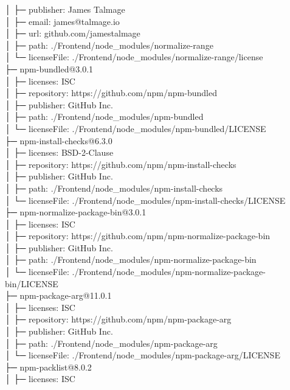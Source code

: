 │  ├─ publisher: James Talmage\\
│  ├─ email: james@talmage.io\\
│  ├─ url: github.com/jamestalmage\\
│  ├─ path: ./Frontend/node\_modules/normalize-range\\
│  └─ licenseFile: ./Frontend/node\_modules/normalize-range/license\\
├─ npm-bundled@3.0.1\\
│  ├─ licenses: ISC\\
│  ├─ repository: https://github.com/npm/npm-bundled\\
│  ├─ publisher: GitHub Inc.\\
│  ├─ path: ./Frontend/node\_modules/npm-bundled\\
│  └─ licenseFile: ./Frontend/node\_modules/npm-bundled/LICENSE\\
├─ npm-install-checks@6.3.0\\
│  ├─ licenses: BSD-2-Clause\\
│  ├─ repository: https://github.com/npm/npm-install-checks\\
│  ├─ publisher: GitHub Inc.\\
│  ├─ path: ./Frontend/node\_modules/npm-install-checks\\
│  └─ licenseFile: ./Frontend/node\_modules/npm-install-checks/LICENSE\\
├─ npm-normalize-package-bin@3.0.1\\
│  ├─ licenses: ISC\\
│  ├─ repository: https://github.com/npm/npm-normalize-package-bin\\
│  ├─ publisher: GitHub Inc.\\
│  ├─ path: ./Frontend/node\_modules/npm-normalize-package-bin\\
│  └─ licenseFile: ./Frontend/node\_modules/npm-normalize-package-bin/LICENSE\\
├─ npm-package-arg@11.0.1\\
│  ├─ licenses: ISC\\
│  ├─ repository: https://github.com/npm/npm-package-arg\\
│  ├─ publisher: GitHub Inc.\\
│  ├─ path: ./Frontend/node\_modules/npm-package-arg\\
│  └─ licenseFile: ./Frontend/node\_modules/npm-package-arg/LICENSE\\
├─ npm-packlist@8.0.2\\
│  ├─ licenses: ISC\\

